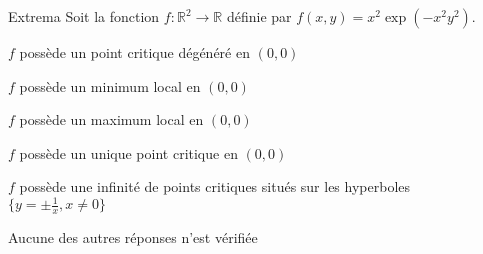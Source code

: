 \documentclass[12pt]{article}
\begin{document}
\begin{quiz}[points=4, multiple, shuffle, penalty=.5]
  \begin{multi}{Extrema}
    Soit la fonction $f:\mathbb R^2\to \mathbb R$ d\'{e}finie par $f(x,y) = x^2 \exp(-x^2y^2)$. 
  \item* $f$ poss\`{e}de un point critique d\'{e}g\'{e}n\'{e}r\'{e} en $(0, 0)$
  \item* $f$ poss\`{e}de un minimum local en $(0, 0)$
  \item $f$ poss\`{e}de un maximum local en $(0, 0)$
  \item $f$ poss\`{e}de un unique point critique en $(0,0)$
  \item $f$ poss\`{e}de une infinit\'{e} de points critiques situ\'{e}s sur les hyperboles  $\{y= \pm \frac{1}{x}, x \neq 0 \}$
  \item Aucune des autres r\'{e}ponses n'est v\'{e}rifi\'{e}e
  \end{multi}


\end{quiz}
\end{document}

